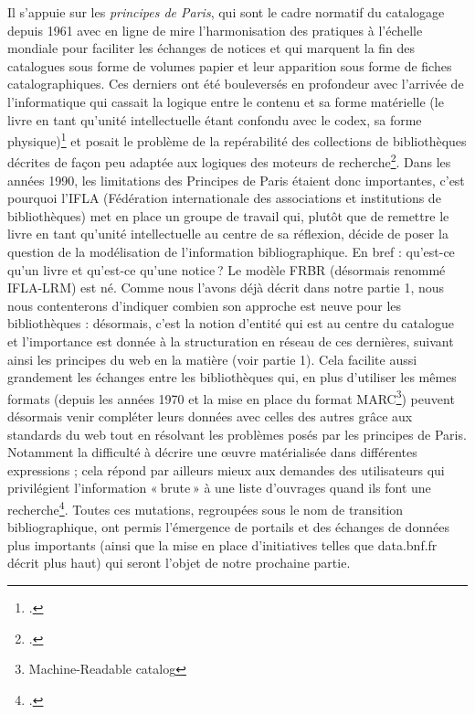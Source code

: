 Il s’appuie sur les \textit{principes de Paris}, qui sont le cadre normatif du catalogage depuis 1961 avec en ligne de mire l’harmonisation des pratiques à l’échelle mondiale pour faciliter les échanges de notices et qui marquent la fin des catalogues sous forme de volumes papier et leur apparition sous forme de fiches catalographiques. Ces derniers ont été bouleversés en profondeur avec l’arrivée de l’informatique qui cassait la logique entre le contenu et sa forme matérielle (le livre en tant qu’unité intellectuelle étant confondu avec le codex, sa forme physique)\footcite[§ 2]{leresche_transition_2016} et posait le problème de la repérabilité des collections de bibliothèques décrites de façon peu adaptée aux logiques des moteurs de recherche\footcite[§ 2]{leresche_transition_2016}. Dans les années 1990, les limitations des Principes de Paris étaient donc importantes, c’est pourquoi l’IFLA (Fédération internationale des associations et institutions de bibliothèques) met en place un groupe de travail qui, plutôt que de remettre le livre en tant qu’unité intellectuelle au centre de sa réflexion, décide de poser la question de la modélisation de l’information bibliographique. En bref : qu’est-ce qu’un livre et qu’est-ce qu’une notice ? Le modèle FRBR (désormais renommé IFLA-LRM) est né. Comme nous l’avons déjà décrit dans notre partie 1, nous nous contenterons d’indiquer combien son approche est neuve pour les bibliothèques : désormais, c’est la notion d’entité qui est au centre du catalogue et l’importance est donnée à la structuration en réseau de ces dernières, suivant ainsi les principes du web en la matière (voir partie 1). Cela facilite aussi grandement les échanges entre les bibliothèques qui, en plus d’utiliser les mêmes formats (depuis les années 1970 et la mise en place du format MARC\footnote{Machine-Readable catalog}) peuvent désormais venir compléter leurs données avec celles des autres grâce aux standards du web tout en résolvant les problèmes posés par les principes de Paris. Notamment la difficulté à décrire une œuvre matérialisée dans différentes expressions ; cela répond par ailleurs mieux aux demandes des utilisateurs qui privilégient l’information « brute » à une liste d’ouvrages quand ils font une recherche\footcite[§ 13]{leresche_transition_2016}. Toutes ces mutations, regroupées sous le nom de transition bibliographique, ont permis l’émergence de portails et des échanges de données plus importants (ainsi que la mise en place d’initiatives telles que data.bnf.fr décrit plus haut) qui seront l’objet de notre prochaine partie.

